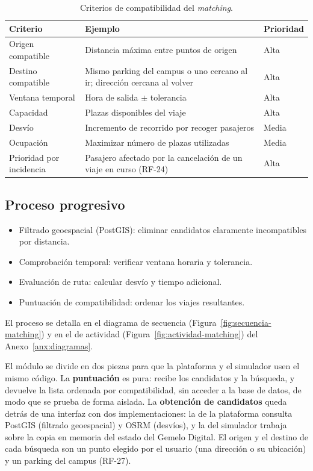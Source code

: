 \begin{table}[H]
  \centering
  \begin{tabularx}{\textwidth}{Y{0.6923} Y{1.6154} Y{0.6923}}
    \hline
    \textbf{Criterio} & \textbf{Ejemplo} & \textbf{Prioridad} \\
    \hline
    Origen compatible & Distancia máxima entre puntos de origen & Alta \\
    Destino compatible & Mismo parking del campus o uno cercano al ir; dirección cercana al volver & Alta \\
    Ventana temporal & Hora de salida $\pm$ tolerancia & Alta \\
    Capacidad & Plazas disponibles del viaje & Alta \\
    Desvío & Incremento de recorrido por recoger pasajeros & Media \\
    Ocupación & Maximizar número de plazas utilizadas & Media \\
    Prioridad por incidencia & Pasajero afectado por la cancelación de un viaje en curso (RF-24) & Alta \\
    \hline
  \end{tabularx}
  \caption{Criterios de compatibilidad del \textit{matching}.}
  \label{tab:criterios}
\end{table}

\subsection{Proceso progresivo}

\begin{itemize}
    \item Filtrado geoespacial (PostGIS): eliminar candidatos claramente incompatibles por distancia.
    \item Comprobación temporal: verificar ventana horaria y tolerancia.
    \item Evaluación de ruta: calcular desvío y tiempo adicional.
    \item Puntuación de compatibilidad: ordenar los viajes resultantes.
\end{itemize}

El proceso se detalla en el diagrama de secuencia (Figura~\ref{fig:secuencia-matching}) y en el de actividad (Figura~\ref{fig:actividad-matching}) del Anexo~\ref{anx:diagramas}.

El módulo se divide en dos piezas para que la plataforma y el simulador usen el mismo código. La \textbf{puntuación} es pura: recibe los candidatos y la búsqueda, y devuelve la lista ordenada por compatibilidad, sin acceder a la base de datos, de modo que se prueba de forma aislada. La \textbf{obtención de candidatos} queda detrás de una interfaz con dos implementaciones: la de la plataforma consulta PostGIS (filtrado geoespacial) y OSRM (desvíos), y la del simulador trabaja sobre la copia en memoria del estado del Gemelo Digital. El origen y el destino de cada búsqueda son un punto elegido por el usuario (una dirección o su ubicación) y un parking del campus (RF-27).

